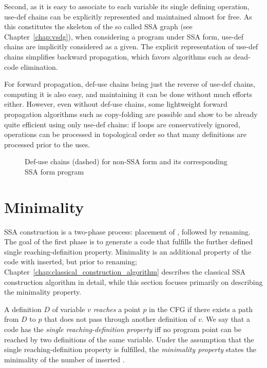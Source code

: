 Second, as it is easy to associate to each variable its single defining operation, use-def chains can be explicitly represented and maintained almost for free. As this constitutes the skeleton of the so called SSA graph (see Chapter~\ref{chap:vsdg}), when considering a program under SSA form, use-def chains are implicitly considered as a given. 
The explicit representation of use-def chains simplifies backward 
propagation, which favors algorithms such as dead-code elimination. 

For forward propagation, def-use chains being just the reverse of use-def chains, computing it is also easy, and maintaining it can be done without much efforts either. 
However, even without def-use chains, some lightweight forward propagation algorithms such as copy-folding are possible and show to be already quite efficient using only use-def chains: if loops are conservatively ignored, operations can be processed in topological order so that many definitions are processed prior to the uses. 


\begin{figure}
\caption{Def-use chains (dashed) for non-SSA form and its corresponding SSA form program} 
\label{fig:properties_and_flavors:du} 
\end{figure}



\section{Minimality}
\label{sec:properties_and_flavors:minimality}

SSA construction is a two-phase process: placement of \phifuns,
followed by renaming. The goal of the first phase is to generate a code that fulfills the further defined single reaching-definition property. Minimality is an additional property of the code with 
\phifuns inserted, but prior to renaming; Chapter~\ref{chap:classical_construction_algorithm} describes the classical SSA
construction algorithm in detail, while this section focuses
primarily on describing the minimality property.  

A definition $D$ of variable $v$ \emph{reaches} a point $p$ in the CFG
if there exists a path from $D$ to $p$ that does not pass through another
definition of $v$. We say that a code has the \emph{single reaching-definition property} iff no program point can be reached by two definitions of the same variable. 
Under the assumption that the single reaching-definition property is fulfilled, the \emph{minimality property} states the minimality of the number of inserted \phifuns.

